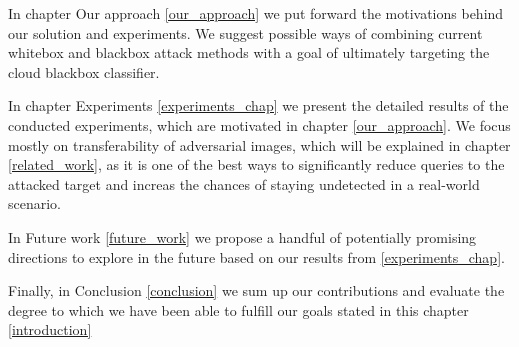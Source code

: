 In chapter Our approach \ref{our_approach} we put forward the motivations behind our solution and experiments. We suggest possible ways of combining current whitebox and blackbox attack methods with a goal of ultimately targeting the cloud blackbox classifier.

In chapter Experiments \ref{experiments_chap} we present the detailed results of the conducted experiments, which are motivated in chapter \ref{our_approach}. We focus mostly on transferability of adversarial images, which will be explained in chapter \ref{related_work}, as it is one of the best ways to significantly reduce queries to the attacked target and increas the chances of staying undetected in a real-world scenario.

In Future work \ref{future_work} we propose a handful of potentially promising directions to explore in the future based on our results from \ref{experiments_chap}.

Finally, in Conclusion \ref{conclusion} we sum up our contributions and evaluate the degree to which we have been able to fulfill our goals stated in this chapter \ref{introduction}